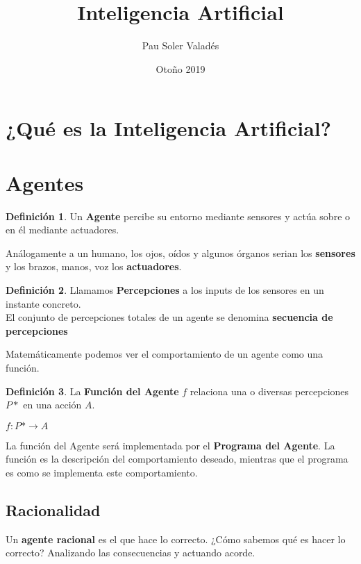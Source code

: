 \documentclass[12pt,a4paper,catalan, leqno]{article} %
\title{Inteligencia Artificial}
\author{Pau Soler Valadés}
\date{Otoño 2019}
\theoremstyle{definition}
\newtheorem{defn}{Definición}[section]
\begin{document}
\maketitle
\thispagestyle{empty}
\pagebreak %
\tableofcontents
\pagebreak

\section{¿Qué es la Inteligencia Artificial?}
\pagebreak
\section{Agentes}

\begin{defn}
Un \textbf{Agente} percibe su entorno mediante sensores y actúa sobre o en él mediante actuadores.
\end{defn}

Análogamente a un humano, los ojos, oídos y algunos órganos serian los \textbf{sensores} y los brazos, manos, voz los \textbf{actuadores}.

\begin{defn}
Llamamos \textbf{Percepciones} a los inputs de los sensores en un instante concreto.
\\El conjunto de percepciones totales de un agente se denomina \textbf{secuencia de percepciones}
\end{defn}

Matemáticamente podemos ver el comportamiento de un agente como una función.

\begin{defn}
La \textbf{Función del Agente} $f$ relaciona una o diversas percepciones $P*$ en una acción $A$.
\begin{center}
    $f: P* \rightarrow A$
\end{center}
\end{defn}

La función del Agente será implementada por el \textbf{Programa del Agente}. La función es la descripción del comportamiento deseado, mientras que el programa es como se implementa este comportamiento.

\subsection{Racionalidad}

Un \textbf{agente racional} es el que hace lo correcto. ¿Cómo sabemos qué es hacer lo correcto? Analizando las consecuencias y actuando acorde.
\end{document}
